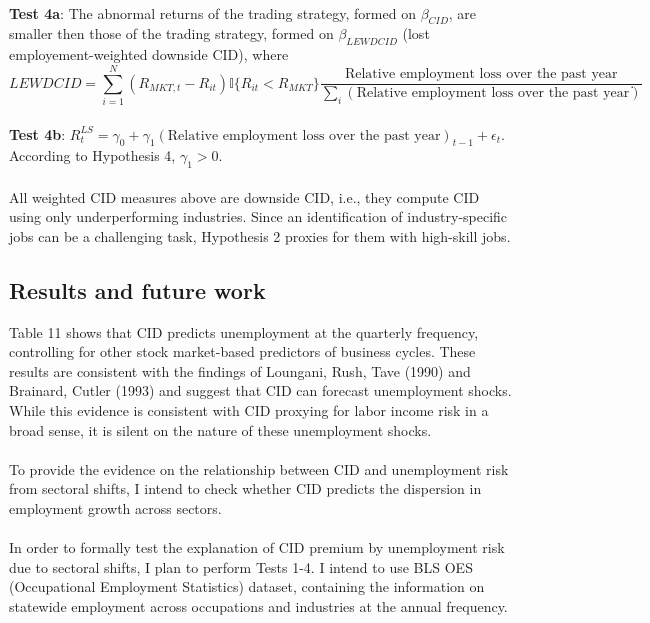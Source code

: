 \documentclass[12pt]{article}
\begin{document}
\paragraph{}
\textbf{Test 4a}: The abnormal returns of the trading strategy, formed on $\beta_{CID}$, are smaller then those of the trading strategy, formed on $\beta_{LEWDCID}$ (lost employement-weighted downside CID), where $$LEWDCID = \sum^{N}_{i=1}{(R_{MKT,t}-R_{it}) \mathbb{I}\{R_{it}<R_{MKT}\} \frac{\text{Relative employment loss over the past year}}{\sum_{i} (\text{Relative employment loss over the past year}) }}.$$
\\ \-\hspace{0.3cm}
\textbf{Test 4b}: $R^{LS}_{t} = \gamma_0 +\gamma_1 (\text{Relative employment loss over the past year})_{t-1} +\epsilon_t$. \\ 
According to Hypothesis 4, $\gamma_1>0$.
\paragraph{}
All weighted CID measures above are downside CID, i.e., they compute CID using only underperforming industries. Since an identification of industry-specific jobs can be a challenging task, Hypothesis 2 proxies for them with high-skill jobs. 

\subsection{Results and future work}

Table 11 shows that CID predicts unemployment at the quarterly frequency, controlling for other stock market-based predictors of business cycles. These results are consistent with the findings of Loungani, Rush, Tave (1990) and Brainard, Cutler (1993) and suggest that CID can forecast unemployment shocks. While this evidence is consistent with CID proxying for labor income risk in a broad sense, it is silent on the nature of these unemployment shocks.
\paragraph{}
To provide the evidence on the relationship between CID and unemployment risk from sectoral shifts, I intend to check whether CID predicts the dispersion in employment growth across sectors.
\paragraph{}
In order to formally test the explanation of CID premium by unemployment risk due to sectoral shifts, I plan to perform Tests 1-4. I intend to use BLS OES (Occupational Employment Statistics) dataset, containing the information on statewide employment across occupations and industries at the annual frequency. 
\end{document}
